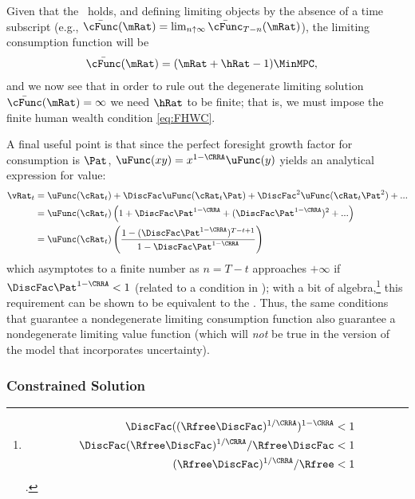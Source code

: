 \documentclass[BufferStockTheory]{subfiles}
\begin{document}
Given that the \RIC~holds, and defining limiting objects by the absence of a time subscript (e.g., $\bar{\cFunc}(\mRat)=\lim_{n \uparrow \infty} \bar{\cFunc}_{T-n}(\mRat)$), the limiting consumption function will be
\begin{align}\label{eq:cFuncPFUnc}
  \bar{\cFunc}(\mRat)  & = (\mRat+\hRat-1)\MinMPC, 
\end{align}
and we now see that in order to rule out the degenerate limiting
solution $\bar{\cFunc}(\mRat) = \infty$ we need $\hRat$ to be finite; that is, we
must impose the finite human wealth condition \eqref{eq:FHWC}.

\hypertarget{ValuePFAnalytical}{}
A final useful point is that since the perfect foresight
growth factor for consumption is $\Pat$, $\uFunc(xy) =
x^{1-\CRRA}\uFunc(y)$ yields an analytical expression for value:  
\begin{align}
  \vRat_{t}  & = \uFunc(\cRat_{t})+\DiscFac \uFunc(\cRat_{t}\Pat)+\DiscFac^{2} \uFunc(\cRat_{t} \Pat^{2})+... \label{eq:ValuePFAnalytical}
  \\  & = \uFunc(\cRat_{t})\left(1+\DiscFac \Pat^{1-\CRRA}+(\DiscFac \Pat^{1-\CRRA})^{2}+...\right) \notag 
  \\  & = \uFunc(\cRat_{t})\left(\frac{1-(\DiscFac \Pat^{1-\CRRA})^{T-t+1}}{1-\DiscFac \Pat^{1-\CRRA}}\right) \notag
\end{align}
which asymptotes to a finite number as $n=T-t$ approaches $+\infty$ if $\DiscFac \Pat^{1-\CRRA} < 1$ (related to a condition in \cite{asHomogeneous}); with a bit of algebra,\footnote{
  \begin{align*}
    \DiscFac ((\Rfree \DiscFac)^{1/\CRRA})^{1-\CRRA}  & < 1
    \\ \DiscFac (\Rfree\DiscFac)^{1/\CRRA}/\Rfree\DiscFac  & < 1
    \\ (\Rfree \DiscFac)^{1/\CRRA} /\Rfree  & < 1
  \end{align*}.
} this requirement can be shown to be equivalent to the {\RIC}.  Thus, the same conditions that guarantee a nondegenerate limiting consumption function also guarantee a nondegenerate limiting value function (which will \textit{not} be true in the version of the model that incorporates uncertainty).


\hypertarget{Constrained-Solution}{}
\subsubsection{Constrained Solution}
\end{document}
